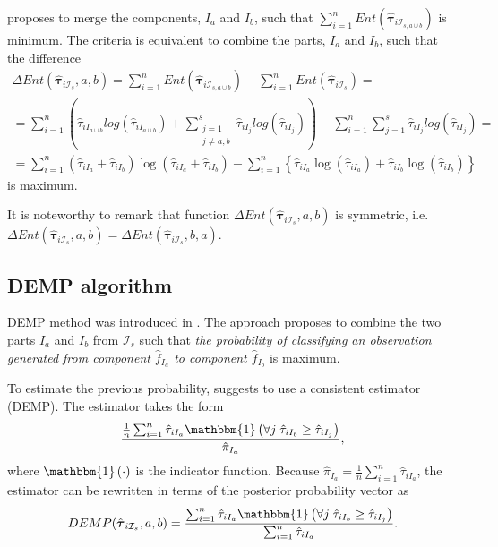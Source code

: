 \documentclass[10pt, a4paper]{article}
\newcommand{\m}[1]{\boldsymbol{#1}}
\begin{document}
 \cite{baudry2010combining} proposes to merge the components, $I_a$ and $I_b$, such that $\sum_{i=1}^n Ent( \hat{\m \tau}_{i \mathcal{I}_{s, a \cup b}} )$ is minimum. The criteria is equivalent to combine the parts, $I_a$ and $I_b$, such that the difference 
\begin{multline*}
\Delta Ent(\hat{\m \tau}_{i \mathcal{I}_s}, a, b) = \sum_{i=1}^n Ent( \hat{\m \tau}_{i \mathcal{I}_{s, a \cup b}}) - \sum_{i=1}^n Ent( \hat{\m \tau}_{i \mathcal{I}_s}) =  \\ = \sum_{i=1}^n  \left( \hat{\tau}_{i I_{a\cup b}}  log(\hat{\tau}_{i I_{a\cup b}} ) +  \sum_{\substack{j=1 \\
                                                            j \neq a, b}}^s \hat{\tau}_{i I_j}  log(\hat{\tau}_{i I_j} ) \right)  - \sum_{i=1}^n \sum_{j=1}^s \hat{\tau}_{i I_j}  log(\hat{\tau}_{i I_j} ) = \\  =   \sum_{i=1}^n  (\hat{\tau}_{iI_a}+\hat{\tau}_{iI_b}) \log(\hat{\tau}_{iI_a} + \hat{\tau}_{iI_b}) - \sum_{i=1}^n \left\{ \hat{\tau}_{iI_a} \log(\hat{\tau}_{iI_a}) + \hat{\tau}_{iI_b} \log(\hat{\tau}_{iI_b})\right\}
\end{multline*}
is maximum.

It is noteworthy to remark that function $\Delta Ent(\hat{\m \tau}_{i \mathcal{I}_s}, a, b)$ is symmetric, i.e. $\Delta Ent(\hat{\m \tau}_{i \mathcal{I}_s}, a, b) = \Delta Ent(\hat{\m \tau}_{i \mathcal{I}_s}, b, a)$.




\subsection*{DEMP algorithm}

DEMP method was introduced in \cite{hennig2010methods}. The approach proposes to combine the two parts $I_a$ and $I_b$ from $ \mathcal{I}_s$ such that \emph{the probability of classifying an observation generated from component $\hat{f}_{I_a}$ to component $\hat{f}_{I_b}$} is maximum.

To estimate the previous probability,  \cite{hennig2010methods} suggests to use a consistent estimator (DEMP). The estimator takes the form
\[
\frac{ \frac{1}{n} \sum_{i=1}^n {\hat{\tau}_{iI_a} \mathbbm{1}\left( \forall j\; \hat{\tau}_{i I_{b}} \geq \hat{\tau}_{iI_j} \right)}}{ \hat{\pi}_{I_a}},
\]
where $\mathbbm{1}\left( \cdot \right)$ is the indicator function. Because $ \hat{\pi}_{I_a} = \frac{1}{n} \sum_{i=1}^n \hat{\tau}_{iI_a}$, the estimator can be rewritten in terms of the posterior probability vector as
\begin{equation}\label{demp_criteria}
DEMP(\hat{\m \tau}_{i \mathcal{I}_s}, a, b) =\frac{ \sum_{i=1}^n {\hat{\tau}_{iI_a} \mathbbm{1}\left( \forall j\; \hat{\tau}_{i I_{b}} \geq \hat{\tau}_{iI_j} \right)}}{\sum_{i=1}^n \hat{\tau}_{iI_a} }.
\end{equation}
\end{document}
